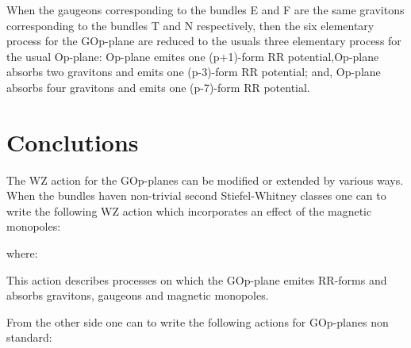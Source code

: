 \documentclass[a4paper,a4paper]{article}
\begin{document}
When the gaugeons corresponding to the bundles E and F are the same gravitons corresponding to the bundles T and N respectively, then the six elementary process for the GOp-plane are reduced to the usuals three elementary process for the usual Op-plane: Op-plane emites one (p+1)-form RR potential,Op-plane
absorbs two gravitons and emits one (p-3)-form RR potential; and, Op-plane absorbs four gravitons and emits one (p-7)-form RR potential.
  
\section{Conclutions}

The WZ action for the GOp-planes can be modified or extended by various ways.
When the bundles haven non-trivial second Stiefel-Whitney classes one can to write the following WZ action which incorporates an effect of the magnetic monopoles:

\begin{center}
{  \coordHE{} }
\end{center}

where:

\begin{center}
{  \coordHE{} }
\end{center}

\begin{center}
{  \coordHE{} }
\end{center}

This action describes processes on which the GOp-plane emites RR-forms and absorbs gravitons, gaugeons and magnetic monopoles.

From the other side one can to write the following actions for GOp-planes non 
standard:

\begin{center}
{  \coordHE{} }
\end{center}
\end{document}
